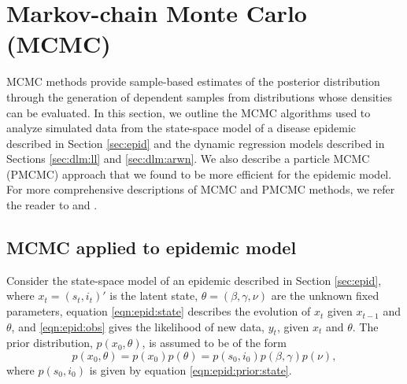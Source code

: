 \section{Markov-chain Monte Carlo (MCMC) \label{sec:mcmc}}

MCMC methods provide sample-based estimates of the posterior distribution through the generation of dependent samples from distributions whose densities can be evaluated. In this section, we outline the MCMC algorithms used to analyze simulated data from the state-space model of a disease epidemic described in Section \ref{sec:epid} and the dynamic regression models described in Sections \ref{sec:dlm:ll} and \ref{sec:dlm:arwn}. We also describe a particle MCMC (PMCMC) approach that we found to be more efficient for the epidemic model. For more comprehensive descriptions of MCMC and PMCMC methods, we refer the reader to \citet{Robe:Case:mont:2004} and \citet{Andr:Douc:Hol:pmcmc:2010}.

\subsection{MCMC applied to epidemic model \label{sec:mcmc:epid}}

Consider the state-space model of an epidemic described in Section \ref{sec:epid}, where $x_t = (s_t,i_t)'$ is the latent state, $\theta = (\beta,\gamma,\nu)$ are the unknown fixed parameters, equation \eqref{eqn:epid:state} describes the evolution of $x_t$ given $x_{t-1}$ and $\theta$, and \eqref{eqn:epid:obs} gives the likelihood of new data, $y_t$, given $x_t$ and $\theta$. The prior distribution, $p(x_0,\theta)$, is assumed to be of the form
\begin{equation}
p(x_0,\theta) = p(x_0)p(\theta) = p(s_0,i_0)p(\beta,\gamma)p(\nu), \label{eqn:epid:prior}
\end{equation}
where $p(s_0,i_0)$ is given by equation \eqref{eqn:epid:prior:state}.

